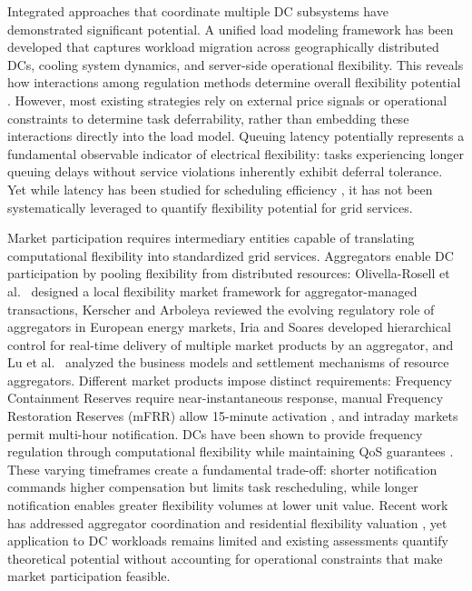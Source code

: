 \documentclass[preprint,12pt]{elsarticle}
\begin{document}
Integrated approaches that coordinate multiple DC subsystems have demonstrated significant potential. A unified load modeling framework has been developed that captures workload migration across geographically distributed DCs, cooling system dynamics, and server-side operational flexibility. This reveals how interactions among regulation methods determine overall flexibility potential \cite{Chen2021_TSG}. However, most existing strategies rely on external price signals or operational constraints to determine task deferrability, rather than embedding these interactions directly into the load model. Queuing latency potentially represents a fundamental observable indicator of electrical flexibility: tasks experiencing longer queuing delays without service violations inherently exhibit deferral tolerance. Yet while latency has been studied for scheduling efficiency \cite{Weng2022, Xiao2020}, it has not been systematically leveraged to quantify flexibility potential for grid services.

Market participation requires intermediary entities capable of translating computational flexibility into standardized grid services. Aggregators enable DC participation by pooling flexibility from distributed resources: Olivella-Rosell et al.\ \cite{Olivella-Rosell2018} designed a local flexibility market framework for aggregator-managed transactions, Kerscher and Arboleya \cite{Kerscher2022} reviewed the evolving regulatory role of aggregators in European energy markets, Iria and Soares \cite{Iria2019} developed hierarchical control for real-time delivery of multiple market products by an aggregator, and Lu et al.\ \cite{Lu2020} analyzed the business models and settlement mechanisms of resource aggregators. Different market products impose distinct requirements: Frequency Containment Reserves require near-instantaneous response, manual Frequency Restoration Reserves (mFRR) allow 15-minute activation \cite{entsoe_balancing}, and intraday markets permit multi-hour notification. DCs have been shown to provide frequency regulation through computational flexibility while maintaining QoS guarantees \cite{Wang2019}. These varying timeframes create a fundamental trade-off: shorter notification commands higher compensation but limits task rescheduling, while longer notification enables greater flexibility volumes at lower unit value. Recent work has addressed aggregator coordination \cite{Iria2019} and residential flexibility valuation \cite{Rasouli2023}, yet application to DC workloads remains limited and existing assessments quantify theoretical potential without accounting for operational constraints that make market participation feasible.
\end{document}
